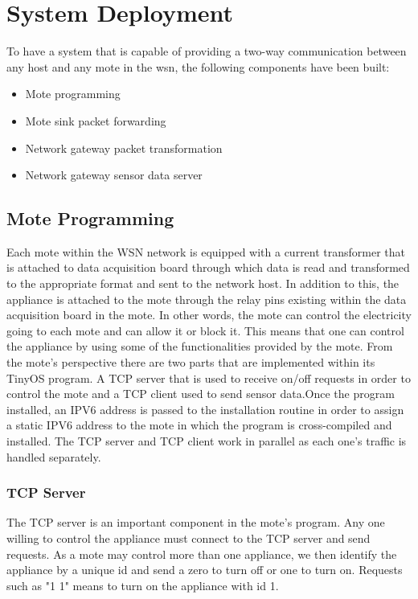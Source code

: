 \documentclass[conference]{IEEEtran}
\begin{document}
\section{System Deployment}
To have a system that is capable of providing a two-way communication between any host and any mote in the \gls{wsn}, the following components have been built:
\begin{itemize}
\item Mote programming
\item Mote sink packet forwarding
\item Network gateway packet transformation
\item Network gateway sensor data server
\end{itemize}

\subsection{Mote Programming}
Each mote within the WSN network is equipped with a current transformer that is attached to data acquisition board through which data is read and transformed to the appropriate format and sent to the network host. In addition to this, the appliance is attached to the mote through the relay pins existing within the data acquisition board in the mote. In other words, the mote can control the electricity going to each mote and can allow it or block it. This means that one can control the appliance by using some of the functionalities provided by the mote. From the mote's perspective there are two parts that are implemented within its TinyOS program. A TCP server that is used to receive on/off requests in order to control the mote and a TCP client used to send sensor data.Once the program installed, an IPV6 address is passed to the installation routine in order to assign a static IPV6 address to the mote in which the program is cross-compiled and installed. The TCP server and TCP client work in parallel as each one's traffic is handled separately.

\subsubsection{TCP Server}
The TCP server is an important component in the mote's program. Any one willing to control the appliance must connect to the TCP server and send requests. As a mote may control more than one appliance, we then identify the appliance by a unique id and send a zero to turn off or one to turn on. Requests such as "1 1" means to turn on the appliance with id 1.
\end{document}
